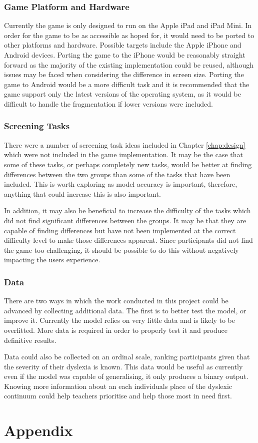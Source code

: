 \documentclass[journal]{IEEEtran}
\begin{document}
\subsubsection{Game Platform and Hardware}
Currently the game is only designed to run on the Apple iPad and iPad Mini. In order for the game to be as accessible as hoped for, it would need to be ported to other platforms and hardware. Possible targets include the Apple iPhone and Android devices. Porting the game to the iPhone would be reasonably straight forward as the majority of the existing implementation could be reused, although issues may be faced when considering the difference in screen size.
Porting the game to Android would be a more difficult task and it is recommended that the game support only the latest versions of the operating system, as it would be difficult to handle the fragmentation if lower versions were included.

\subsubsection{Screening Tasks}
There were a number of screening task ideas included in Chapter \ref{chap:design} which were not included in the game implementation. It may be the case that some of these tasks, or perhaps completely new tasks, would be better at finding differences between the two groups than some of the tasks that have been included. This is worth exploring as model accuracy is important, therefore, anything that could increase this is also important.

In addition, it may also be beneficial to increase the difficulty of the tasks which did not find significant differences between the groups. It may be that they are capable of finding differences but have not been implemented at the correct difficulty level to make those differences apparent. Since participants did not find the game too challenging, it should be possible to do this without negatively impacting the users experience.

\subsubsection{Data}
There are two ways in which the work conducted in this project could be advanced by collecting additional data. 
The first is to better test the model, or improve it. Currently the model relies on very little data and is likely to be overfitted. More data is required in order to properly test it and produce definitive results.

Data could also be collected on an ordinal scale, ranking participants given that the severity of their dyslexia is known. This data would be useful as currently even if the model was capable of generalising, it only produces a binary output. Knowing more information about an each individuals place of the dyslexic continuum could help teachers prioritise and help those most in need first.



\section{Appendix}
\end{document}
